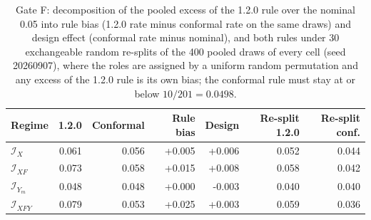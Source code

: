 \begin{table}[!tbp]
\caption{Gate F: decomposition of the pooled excess of the 1.2.0 rule over the nominal 0.05 into rule bias (1.2.0 rate minus conformal rate on the same draws) and design effect (conformal rate minus nominal), and both rules under 30 exchangeable random re-splits of the 400 pooled draws of every cell (seed 20260907), where the roles are assigned by a uniform random permutation and any excess of the 1.2.0 rule is its own bias; the conformal rule must stay at or below $10/201=0.0498$.}
\label{tab:s-family-decomposition}
\centering
\scriptsize
\setlength{\tabcolsep}{2.6pt}
\begin{tabular}{@{}lrrrrrr@{}}
\toprule
Regime & 1.2.0 & Conformal & Rule bias & Design & Re-split 1.2.0 & Re-split conf. \\
\midrule
$\mathcal I_X$ & 0.061 & 0.056 & +0.005 & +0.006 & 0.052 & 0.044 \\
$\mathcal I_{XF}$ & 0.073 & 0.058 & +0.015 & +0.008 & 0.058 & 0.042 \\
$\mathcal I_{Y_m}$ & 0.048 & 0.048 & +0.000 & -0.003 & 0.040 & 0.040 \\
$\mathcal I_{XFY}$ & 0.079 & 0.053 & +0.025 & +0.003 & 0.059 & 0.036 \\
\bottomrule
\end{tabular}
\end{table}
